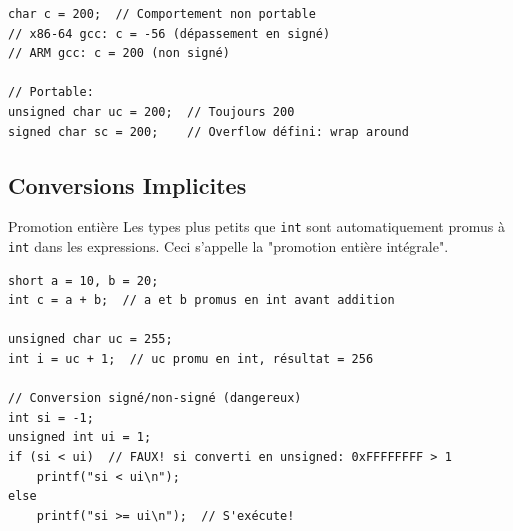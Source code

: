 \documentclass[10pt,a4paper]{article}
\begin{document}
\begin{lstlisting}[caption={Comportement dépendant de l'implémentation}]
char c = 200;  // Comportement non portable
// x86-64 gcc: c = -56 (dépassement en signé)
// ARM gcc: c = 200 (non signé)

// Portable:
unsigned char uc = 200;  // Toujours 200
signed char sc = 200;    // Overflow défini: wrap around
\end{lstlisting}

\subsection{Conversions Implicites}

\begin{definitionbox}{Promotion entière}
Les types plus petits que \texttt{int} sont automatiquement promus à \texttt{int} dans les expressions. Ceci s'appelle la "promotion entière intégrale".
\end{definitionbox}

\begin{lstlisting}[caption={Promotion et conversions}]
short a = 10, b = 20;
int c = a + b;  // a et b promus en int avant addition

unsigned char uc = 255;
int i = uc + 1;  // uc promu en int, résultat = 256

// Conversion signé/non-signé (dangereux)
int si = -1;
unsigned int ui = 1;
if (si < ui)  // FAUX! si converti en unsigned: 0xFFFFFFFF > 1
    printf("si < ui\n");
else
    printf("si >= ui\n");  // S'exécute!
\end{lstlisting}

\begin{center}
\end{center}
\end{document}
